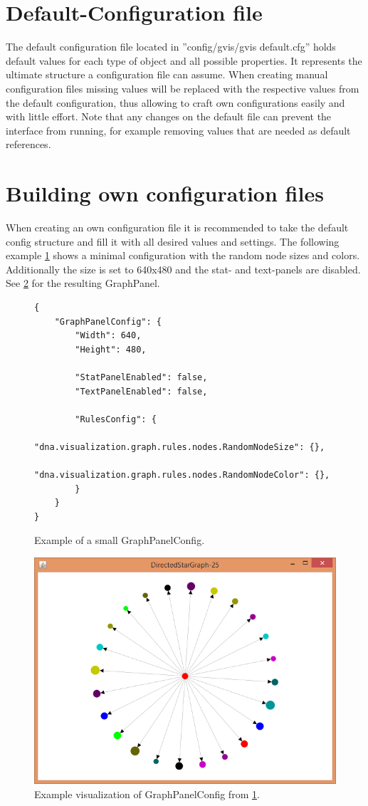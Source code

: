 \section{Default-Configuration file}
The default configuration file located in ”config/gvis/gvis default.cfg” holds default values for each type of object and all possible properties. It represents the ultimate structure a configuration file can assume. When creating manual configuration files missing values will be replaced with the respective values from the default configuration, thus allowing to craft own configurations easily and with little effort. Note that any changes on the default file can prevent the interface from running, for example removing values that are needed as default references.

\section{Building own configuration files}
When creating an own configuration file it is recommended to take the default config structure and fill it with all desired values and settings. The following example \ref{config:randomNodes} shows a minimal configuration with the random node sizes and colors. Additionally the size is set to 640x480 and the stat- and text-panels are disabled. See \ref{fig:randomNodesVis} for the resulting GraphPanel.

\begin{figure} [h]
\begin{lstlisting}
{
	"GraphPanelConfig": {
		"Width": 640, 
		"Height": 480,
	
		"StatPanelEnabled": false,
		"TextPanelEnabled": false,
	
		"RulesConfig": {	
			"dna.visualization.graph.rules.nodes.RandomNodeSize": {},
			"dna.visualization.graph.rules.nodes.RandomNodeColor": {},
		}
	}
}
\end{lstlisting}
\caption{Example of a small GraphPanelConfig.}
\label{config:randomNodes}
\end{figure}

\begin{figure} [h]
\centering
\includegraphics [scale=0.9] {images/random-node-example}
\caption{Example visualization of GraphPanelConfig from \ref{config:randomNodes}.}
\label{fig:randomNodesVis}
\end{figure}


